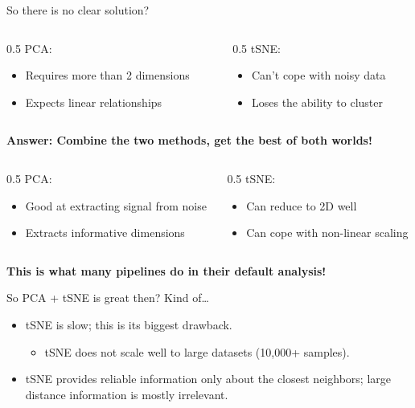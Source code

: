 \begin{frame}[allowframebreaks]{So there is no clear solution?}
    \begin{columns}
    \begin{column}{0.5\textwidth}
        PCA:
        \begin{itemize}
            \item Requires more than 2 dimensions
            \item Expects linear relationships
        \end{itemize}
    \end{column}
    \begin{column}{0.5\textwidth}
        tSNE:
        \begin{itemize}
            \item Can’t cope with noisy data
            \item Loses the ability to cluster
        \end{itemize}
    \end{column}
    \end{columns}
    \vspace{1em}
    \textbf{Answer: Combine the two methods, get the best of both worlds!}
    \vspace{1em}
    \begin{columns}
    \begin{column}{0.5\textwidth}
        PCA:
        \begin{itemize}
            \item Good at extracting signal from noise
            \item Extracts informative dimensions
        \end{itemize}
    \end{column}
    \begin{column}{0.5\textwidth}
        tSNE:
        \begin{itemize}
            \item Can reduce to 2D well
            \item Can cope with non-linear scaling
        \end{itemize}
    \end{column}
    \end{columns}
    \vspace{1em}
    \textbf{This is what many pipelines do in their default analysis!}

\end{frame}

\begin{frame}[allowframebreaks]{So PCA + tSNE is great then?}
    Kind of\dots
    \begin{itemize}
        \item tSNE is slow; this is its biggest drawback.
        \begin{itemize}
            \item tSNE does not scale well to large datasets (10,000+ samples).
        \end{itemize}
        \item tSNE provides reliable information only about the closest neighbors; large distance information is mostly irrelevant.
    \end{itemize}
\end{frame}